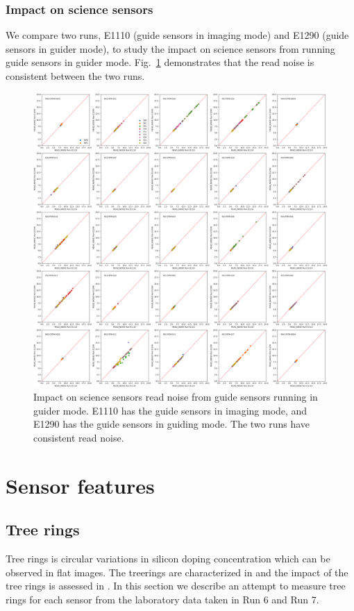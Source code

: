 \subsubsection*{Impact on science sensors}\label{sec:guiderimpactonscience}
We compare two runs, E1110 (guide sensors in imaging mode) and E1290 (guide sensors in guider mode), to study the impact on science sensors from running guide sensors in guider mode. Fig.~\ref{fig:guider_noise} demonstrates that the read noise is consistent between the two runs.
\begin{figure}[ht]
    \centering
    \includegraphics[width=0.95\linewidth]{figures/E1110_E1290_READ_NOISE.png}
    \caption{Impact on science sensors read noise from guide sensors running in guider mode. E1110 has the guide sensors in imaging mode, and E1290 has the guide sensors in guiding mode. The two runs have consistent read noise.}
    \label{fig:guider_noise}
\end{figure}

\section{Sensor features}\label{sensor-features}

\subsection{Tree rings}\label{tree-rings}
Tree rings is circular variations in silicon doping concentration which can be observed in flat images. The treerings are characterized in \citet{2017Jinst..12C05015,2020JATIS...6a1005P} and the impact of the tree rings is assessed in \citet{2023PASP..135k5003E}. In this section we describe an attempt to measure tree rings for each sensor from the laboratory data taken in Run 6 and Run 7.
